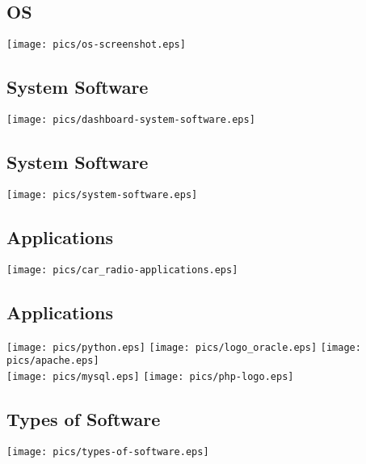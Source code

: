 \documentclass[xga]{xdvislides}
\begin{document}
\subsection{OS}
\begin{center}
	\texttt{[image: pics/os-screenshot.eps]}
\end{center}

\subsection{System Software}
\begin{center}
	\texttt{[image: pics/dashboard-system-software.eps]}
\end{center}

\subsection{System Software}
\begin{center}
	\texttt{[image: pics/system-software.eps]}
\end{center}

\subsection{Applications}
\begin{center}
	\texttt{[image: pics/car\_radio-applications.eps]}
\end{center}

\subsection{Applications}
\begin{center}
	\texttt{[image: pics/python.eps]}
	\texttt{[image: pics/logo\_oracle.eps]}
	\texttt{[image: pics/apache.eps]} \\
	\texttt{[image: pics/mysql.eps]}
	\texttt{[image: pics/php-logo.eps]}
\end{center}

\subsection{Types of Software}
\vfill
\begin{center}
	\texttt{[image: pics/types-of-software.eps]}
\end{center}
\vfill
\end{document}

